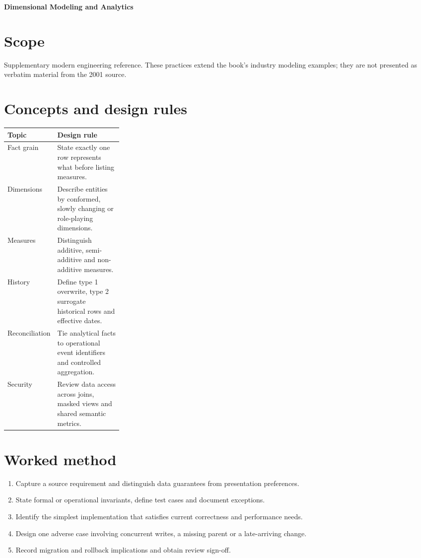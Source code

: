 \documentclass[11pt,letterpaper]{article}
\begin{document}
\begin{center}
{\LARGE\bfseries\color{navy} Dimensional Modeling and Analytics}\par
\vspace{0.25em}{\large Supplementary technical reference}\par
{}
\end{center}
\vspace{0.8em}
\section{Scope}
Supplementary modern engineering reference. These practices extend the book's industry modeling examples; they are not presented as verbatim material from the 2001 source.


\section{Concepts and design rules}
\begin{tabularx}{\linewidth}{@{}>{\raggedright\arraybackslash}p{0.27\linewidth}>{\raggedright\arraybackslash}X@{}}
\toprule
\textbf{Topic} & \textbf{Design rule} \\ 
\midrule
Fact grain & State exactly one row represents what before listing measures. \\ 
Dimensions & Describe entities by conformed, slowly changing or role-playing dimensions. \\ 
Measures & Distinguish additive, semi-additive and non-additive measures. \\ 
History & Define type 1 overwrite, type 2 surrogate historical rows and effective dates. \\ 
Reconciliation & Tie analytical facts to operational event identifiers and controlled aggregation. \\ 
Security & Review data access across joins, masked views and shared semantic metrics. \\ 
\bottomrule
\end{tabularx}

\section{Worked method}
\begin{enumerate}
\item Capture a source requirement and distinguish data guarantees from presentation preferences.
\item State formal or operational invariants, define test cases and document exceptions.
\item Identify the simplest implementation that satisfies current correctness and performance needs.
\item Design one adverse case involving concurrent writes, a missing parent or a late-arriving change.
\item Record migration and rollback implications and obtain review sign-off.
\end{enumerate}
\end{document}
